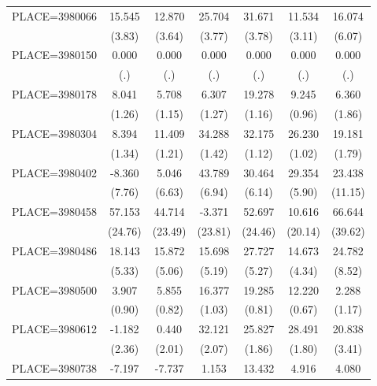 {\begin{tabular}{l*{6}{c}}
PLACE=3980066       &      15.545&      12.870&      25.704&      31.671&      11.534&      16.074\\
                    &      (3.83)&      (3.64)&      (3.77)&      (3.78)&      (3.11)&      (6.07)\\
PLACE=3980150       &       0.000&       0.000&       0.000&       0.000&       0.000&       0.000\\
                    &         (.)&         (.)&         (.)&         (.)&         (.)&         (.)\\
PLACE=3980178       &       8.041&       5.708&       6.307&      19.278&       9.245&       6.360\\
                    &      (1.26)&      (1.15)&      (1.27)&      (1.16)&      (0.96)&      (1.86)\\
PLACE=3980304       &       8.394&      11.409&      34.288&      32.175&      26.230&      19.181\\
                    &      (1.34)&      (1.21)&      (1.42)&      (1.12)&      (1.02)&      (1.79)\\
PLACE=3980402       &      -8.360&       5.046&      43.789&      30.464&      29.354&      23.438\\
                    &      (7.76)&      (6.63)&      (6.94)&      (6.14)&      (5.90)&     (11.15)\\
PLACE=3980458       &      57.153&      44.714&      -3.371&      52.697&      10.616&      66.644\\
                    &     (24.76)&     (23.49)&     (23.81)&     (24.46)&     (20.14)&     (39.62)\\
PLACE=3980486       &      18.143&      15.872&      15.698&      27.727&      14.673&      24.782\\
                    &      (5.33)&      (5.06)&      (5.19)&      (5.27)&      (4.34)&      (8.52)\\
PLACE=3980500       &       3.907&       5.855&      16.377&      19.285&      12.220&       2.288\\
                    &      (0.90)&      (0.82)&      (1.03)&      (0.81)&      (0.67)&      (1.17)\\
PLACE=3980612       &      -1.182&       0.440&      32.121&      25.827&      28.491&      20.838\\
                    &      (2.36)&      (2.01)&      (2.07)&      (1.86)&      (1.80)&      (3.41)\\
PLACE=3980738       &      -7.197&      -7.737&       1.153&      13.432&       4.916&       4.080\\

\end{tabular}}
